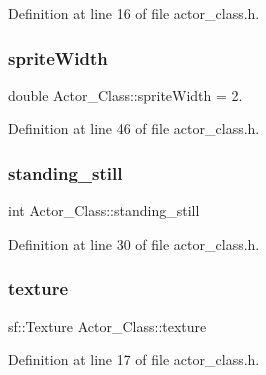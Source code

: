 Definition at line 16 of file actor\+\_\+class.\+h.

\hypertarget{class_actor___class_a58010eaaca47d2e529d11f898fadebb9}{}\label{class_actor___class_a58010eaaca47d2e529d11f898fadebb9} 
\subsubsection{\texorpdfstring{sprite\+Width}{spriteWidth}}
{\footnotesize\ttfamily double Actor\+\_\+\+Class\+::sprite\+Width = 2.}



Definition at line 46 of file actor\+\_\+class.\+h.

\hypertarget{class_actor___class_a162d16a5e6b738af5a7d6d84b3d5e376}{}\label{class_actor___class_a162d16a5e6b738af5a7d6d84b3d5e376} 
\subsubsection{\texorpdfstring{standing\+\_\+still}{standing\_still}}
{\footnotesize\ttfamily int Actor\+\_\+\+Class\+::standing\+\_\+still}



Definition at line 30 of file actor\+\_\+class.\+h.

\hypertarget{class_actor___class_ac01a0438aa7e21d9c6ef4110546b1d72}{}\label{class_actor___class_ac01a0438aa7e21d9c6ef4110546b1d72} 
\subsubsection{\texorpdfstring{texture}{texture}}
{\footnotesize\ttfamily sf\+::\+Texture Actor\+\_\+\+Class\+::texture}



Definition at line 17 of file actor\+\_\+class.\+h.

\hypertarget{class_actor___class_a51e346bc448f9f533e3b8762d6c7ea39}{}\label{class_actor___class_a51e346bc448f9f533e3b8762d6c7ea39} 
